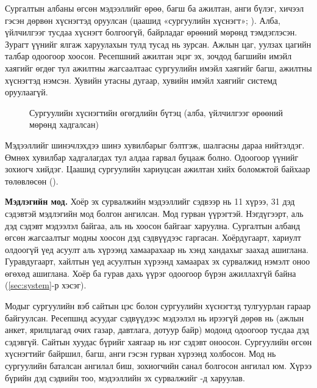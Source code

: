 Сургалтын албаны өгсөн мэдээллийг өрөө, багш ба ажилтан, анги бүлэг, хичээл гэсэн дөрвөн хүснэгтэд оруулсан (цаашид «сургуулийн хүснэгт»; ). Алба, үйлчилгээг тусдаа хүснэгт болгоогүй, байрладаг өрөөний мөрөнд тэмдэглэсэн. Зурагт үүнийг ялгаж харуулахын тулд тусад нь зурсан. Ажлын цаг, уулзах цагийн талбар одоогоор хоосон. Ресепшний ажилтан эцэг эх, зочдод багшийн имэйл хаягийг өгдөг тул ажилтны жагсаалтаас сургуулийн имэйл хаягийг багш, ажилтны хүснэгтэд нэмсэн. Хувийн утасны дугаар, хувийн имэйл хаягийг системд оруулаагүй.

\begin{figure}[ht]
\centering
{}
\caption{Сургуулийн хүснэгтийн өгөгдлийн бүтэц (алба, үйлчилгээг өрөөний мөрөнд хадгалсан)}
\label{fig:datamodel}
\end{figure}

Мэдээллийг шинэчлэхдээ шинэ хувилбарыг бэлтгэж, шалгасны дараа нийтэлдэг. Өмнөх хувилбар хадгалагдах тул алдаа гарвал буцааж болно. Одоогоор үүнийг зохиогч хийдэг. Цаашид сургуулийн хариуцсан ажилтан хийх боломжтой байхаар төлөвлөсөн ().

\textbf{Мэдлэгийн мод.} Хоёр эх сурвалжийн мэдээллийг сэдвээр нь 11 хүрээ, 31 дэд сэдэвтэй мэдлэгийн мод болгон ангилсан. Мод гурван үүрэгтэй. Нэгдүгээрт, аль дэд сэдэвт мэдээлэл байгаа, аль нь хоосон байгааг харуулна. Сургалтын албанд өгсөн жагсаалтыг модны хоосон дэд сэдвүүдээс гаргасан. Хоёрдугаарт, хариулт олдоогүй үед асуулт аль хүрээнд хамаарахаар нь хэнд хандахыг заахад ашиглана. Гуравдугаарт, хайлтын үед асуултын хүрээнд хамаарах эх сурвалжид нэмэлт оноо өгөхөд ашиглана. Хоёр ба гурав дахь үүрэг одоогоор бүрэн ажиллахгүй байна (\ref{sec:system}-р хэсэг).

Модыг сургуулийн вэб сайтын цэс болон сургуулийн хүснэгтэд тулгуурлан гараар байгуулсан. Ресепшнд асуудаг сэдвүүдээс мэдээлэл нь ирээгүй дөрөв нь (ажлын анкет, ярилцлагад очих газар, давтлага, дотуур байр) модонд одоогоор тусдаа дэд сэдэвгүй. Сайтын хуудас бүрийг хаягаар нь нэг сэдэвт оноосон. Сургуулийн өгсөн хүснэгтийг байршил, багш, анги гэсэн гурван хүрээнд холбосон. Мод нь сургуулийн баталсан ангилал биш, зохиогчийн санал болгосон ангилал юм. Хүрээ бүрийн дэд сэдвийн тоо, мэдээллийн эх сурвалжийг -д харуулав.

